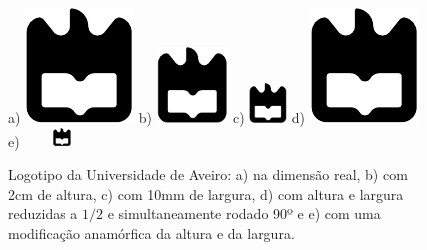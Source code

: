 \begin{figure}[h]
\center %
a) \includegraphics{ua.pdf}
b) \includegraphics[height=2cm]{ua.pdf}
c) \includegraphics[width=10mm]{ua.pdf}
d) \includegraphics[scale=.5,angle=90]{ua.pdf}
e) \includegraphics[height=5mm,width=2cm]{ua.pdf}
\caption{Logotipo da Universidade de Aveiro: a) na dimensão real,
b) com 2cm de altura, c) com 10mm de largura, d) com altura e largura
reduzidas a $1/2$ e simultaneamente rodado 90º e e) com uma modificação
anamórfica da altura e da largura.}
\label{fig:ualogo.2}
\end{figure}



